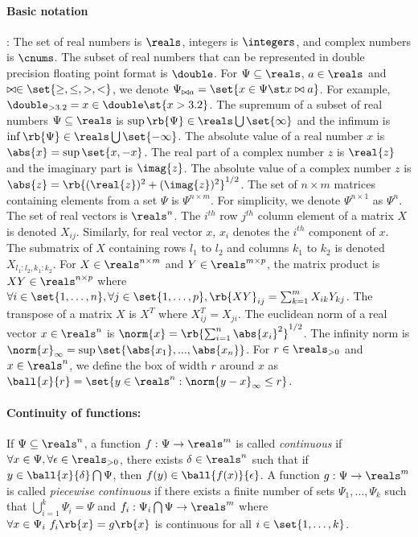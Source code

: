 \paragraph{Basic notation}:  The set of real numbers is $\reals$,
integers is $\integers$, and complex numbers is $\cnums$.  The subset
of real numbers that can be represented in double precision floating
point format is $\double$.  For $\Psi\subseteq\reals$, $a\in\reals$
and $\bowtie\in\set{\geq,\leq,>,<}$, we denote $\Psi_{\bowtie a}
= \set{ x\in\Psi \st x \bowtie a }$.  For example, $\double_{>3.2} =
{x\in\double\st{x>3.2}}$.  The supremum of a subset of real numbers
$\Psi\subseteq\reals$ is $\sup\rb{\Psi}\in\reals\bigcup\set{\infty}$
and the infimum is $\inf\rb{\Psi}\in\reals\bigcup\set{-\infty}$.  The
absolute value of a real number $x$ is $\abs{x} = \sup\set{x,-x}$.
The real part of a complex number $z$ is $\real{z}$ and the imaginary
part is $\imag{z}$.  The absolute value of a complex number $z$ is
$\abs{z} = \rb{(\real{z})^2 + (\imag{z})^2}^{1/2}$.
The set of $n\times m$ matrices containing elements from a set $\Psi$
is $\Psi^{n\times m}$.  For simplicity, we denote $\Psi^{n\times 1}$
as $\Psi^n$.  The set of real vectors is $\reals^n$.  The $i^{th}$ row
$j^{th}$ column element of a matrix $X$ is denoted $X_{ij}$.
Similarly, for real vector $x$, $x_i$ denotes the $i^{th}$ component
of $x$.  The submatrix of $X$ containing rows $l_1$ to $l_2$ and
columns $k_1$ to $k_2$ is denoted $X_{l_1:l_2,k_1:k_2}$.  For
$X\in\reals^{n\times m}$ and $Y\in\reals^{m\times p}$, the matrix
product is $XY\in\reals^{n\times p}$ where $\forall
i\in\set{1,\ldots,n},\forall j\in\set{1,\ldots,p},\rb{XY}_{ij}
= \sum_{k=1}^{m}X_{ik}Y_{kj}$.  The transpose of a matrix $X$ is $X^T$
where $X^T_{ij} = X_{ji}$.  The euclidean norm of a real vector
$x\in\reals^n$ is $\norm{x} = \rb{\sum_{i=1}^n\abs{x_i}^2}^{1/2}$.
The infinity norm is $\norm{x}_\infty
= \sup\set{\abs{x_1},...,\abs{x_n}}$.  For $r\in\reals_{> 0}$ and
$x\in\reals^n$, we define the box of width $r$ around $x$ as
$\ball{x}{r} = \set{ y\in\reals^n: \norm{y - x}_\infty \leq r }$.
%
\paragraph{Continuity of functions:} If $\Psi\subseteq\reals^n$, a
function $f:\Psi\rightarrow\reals^m$ is called \emph{continuous} if
$\forall x\in\Psi,\forall\epsilon\in\reals_{>0}$, there exists
$\delta\in\reals^n$ such that if $y\in\ball{x}{\delta}\bigcap\Psi$,
then $f(y)\in\ball{f(x)}{\epsilon}$.  A function
$g:\Psi\rightarrow\reals^m$ is called \emph{piecewise continuous} if
there exists a finite number of sets $\Psi_1,\ldots,\Psi_k$ such that
$\bigcup_{i=1}^k\Psi_i=\Psi$ and
$f_i:\Psi_i\bigcap\Psi\rightarrow \reals^m$ where $\forall x\in\Psi_i~f_i\rb{x}=g\rb{x}$ is continuous for all
$i\in\set{1,\ldots,k}$.
%
